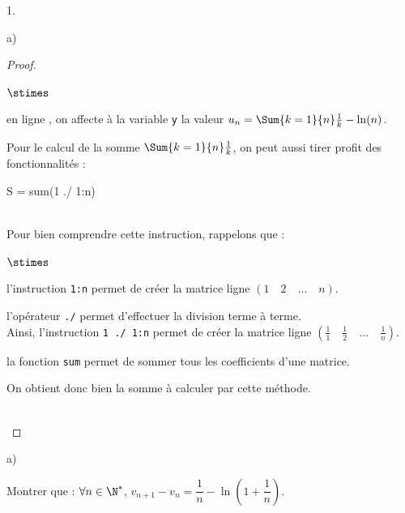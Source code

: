\begin{noliste}{1.}
\begin{noliste}{a)}
\begin{proof}
\begin{noliste}{$\stimes$}
      \item en ligne , on affecte à la variable {\tt y} la
        valeur $u_n = \Sum{k=1}{n} \frac{1}{k} - \ln(n)$.        
      \end{noliste}
      \begin{remark}%
        Pour le calcul de la somme $\Sum{k=1}{n} \frac{1}{k}$, on peut
        aussi tirer profit des fonctionnalités \Scilab{} :\\%
        \begin{scilabNC} 
          \qquad S = sum(1 ./ 1:n)
        \end{scilabNC}~\\[-.2cm]
        Pour bien comprendre cette instruction, rappelons que : 
        \begin{noliste}{$\stimes$}
        \item l'instruction {\tt 1:n} permet de créer la matrice ligne
          $(1 \quad 2 \quad \ldots \quad n)$.
        \item l'opérateur {\tt ./} permet d'effectuer la division
          terme à terme.\\
          Ainsi, l'instruction {\tt 1 ./ 1:n} permet de créer la
          matrice ligne $(\frac{1}{1} \quad \frac{1}{2} \quad \ldots
          \quad \frac{1}{n})$.
        \item la fonction {\tt sum} permet de sommer tous les
          coefficients d'une matrice.
        \end{noliste}
        On obtient donc bien la somme à calculer par cette méthode.
      \end{remark}~\\[-1.4cm]
    \end{proof}
  \end{noliste}


  \newpage


\item 
  \begin{noliste}{a)}
    \setlength{\itemsep}{2mm}
  \item Montrer que : $\forall n \in \N^*$, $v_{n + 1}-v_{n} =
    \dfrac{1}{n} - \ln \left(1 + \dfrac{1}{n} \right)$.


\end{noliste}
\end{noliste}
